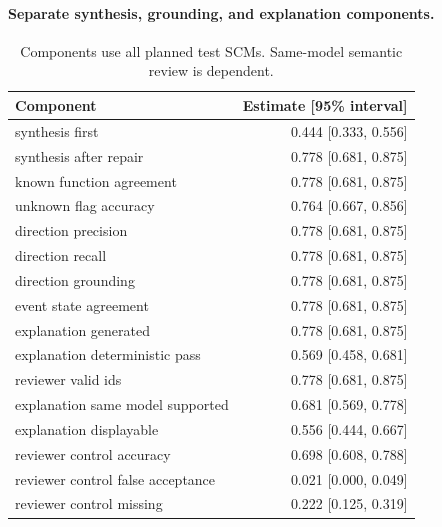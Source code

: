 \paragraph{Separate synthesis, grounding, and explanation components.}

\begin{table}[t]\centering\small\begin{tabular}{lr}\toprule Component & Estimate [95\% interval]\\\midrule

synthesis first & 0.444 [0.333, 0.556]\\

synthesis after repair & 0.778 [0.681, 0.875]\\

known function agreement & 0.778 [0.681, 0.875]\\

unknown flag accuracy & 0.764 [0.667, 0.856]\\

direction precision & 0.778 [0.681, 0.875]\\

direction recall & 0.778 [0.681, 0.875]\\

direction grounding & 0.778 [0.681, 0.875]\\

event state agreement & 0.778 [0.681, 0.875]\\

explanation generated & 0.778 [0.681, 0.875]\\

explanation deterministic pass & 0.569 [0.458, 0.681]\\

reviewer valid ids & 0.778 [0.681, 0.875]\\

explanation same model supported & 0.681 [0.569, 0.778]\\

explanation displayable & 0.556 [0.444, 0.667]\\

reviewer control accuracy & 0.698 [0.608, 0.788]\\

reviewer control false acceptance & 0.021 [0.000, 0.049]\\

reviewer control missing & 0.222 [0.125, 0.319]\\

\bottomrule\end{tabular}\caption{Components use all planned test SCMs. Same-model semantic review is dependent.}\label{tab:components}\end{table}

